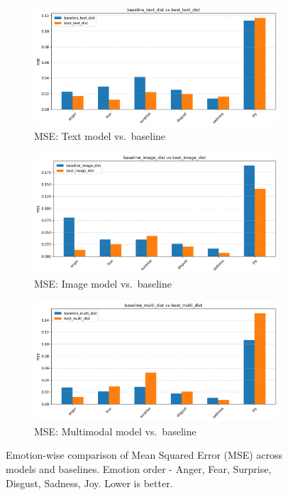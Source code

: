 \begin{figure}[ht]
    \centering
    \begin{subfigure}[b]{0.48\textwidth}
        \includegraphics[width=\textwidth]{images/plot_1.png}
        \caption{MSE: Text model vs.\ baseline}
        \label{fig:mse-text}
    \end{subfigure}
    \hfill
    \begin{subfigure}[b]{0.48\textwidth}
        \includegraphics[width=\textwidth]{images/plot_2.png}
        \caption{MSE: Image model vs.\ baseline}
        \label{fig:mse-img}
    \end{subfigure}
    \begin{subfigure}[b]{0.48\textwidth}
        \includegraphics[width=\textwidth]{images/plot_3.png}
        \caption{MSE: Multimodal model vs.\ baseline}
        \label{fig:mse-multi}
    \end{subfigure}
    \caption{Emotion-wise comparison of Mean Squared Error (MSE) across models and baselines. Emotion order - Anger, Fear, Surprise, Disgust, Sadness, Joy. Lower is better.}
    \label{fig:mse-all}
\end{figure}

